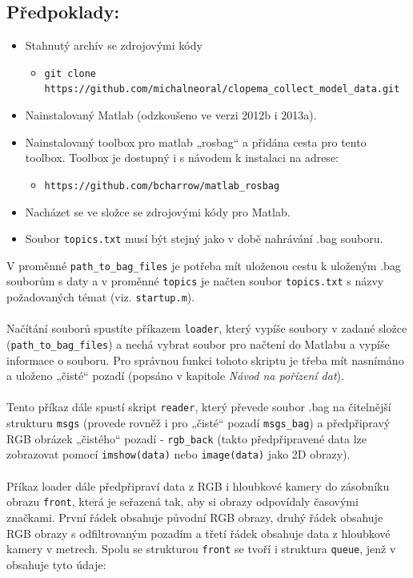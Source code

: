 \documentclass[10pt,a4paper,titlepage,oneside]{book}
\begin{document}
\subsection*{Předpoklady:}
\begin{itemize}
   \item Stahnutý archív se zdrojovými kódy
  \begin{itemize}
  	\item \verb|git clone https://github.com/michalneoral/clopema_collect_model_data.git|
  \end{itemize}
  
  \item Nainstalovaný Matlab (odzkoušeno ve verzi 2012b i 2013a).
  \item Nainstalovaný toolbox pro matlab „rosbag“ a přidána cesta pro tento toolbox. Toolbox je dostupný i s návodem k instalaci na adrese:
  \begin{itemize}
     \item \verb|https://github.com/bcharrow/matlab_rosbag|
  \end{itemize}
  \item Nacházet se ve složce se zdrojovými kódy pro Matlab.
  \item Soubor \verb|topics.txt| musí být stejný jako v době nahrávání .bag souboru.
\end{itemize}

V proměnné \verb|path_to_bag_files| je potřeba mít uloženou cestu k uloženým .bag souborům s daty a v proměnné \verb|topics| je načten soubor \verb|topics.txt| s názvy požadovaných témat (viz. \verb|startup.m|).\\
\\
Načítání souborů spustíte příkazem \verb|loader|, který vypíše soubory v zadané složce (\verb|path_to_bag_files|) a nechá vybrat soubor pro načtení do Matlabu a vypíše informace o souboru. Pro správnou funkci tohoto skriptu je třeba mít nasnímáno a uloženo „čisté“ pozadí (popsáno v kapitole \textit{Návod na pořízení dat}).\\
\\
Tento příkaz dále spustí skript \verb|reader|, který převede soubor .bag na čitelnější strukturu \verb|msgs| (provede rovněž i pro „čisté“ pozadí \verb|msgs_bag|) a předpřipravý RGB obrázek „čistého“ pozadí - \verb|rgb_back| (takto předpřipravené data lze zobrazovat pomocí \verb|imshow(data)| nebo \verb|image(data)| jako 2D obrazy). \\
\\
Příkaz loader dále předpřipraví data z RGB i hloubkové kamery do zásobníku obrazu \verb|front|, která je seřazená tak, aby si obrazy odpovídaly časovými značkami. První řádek obsahuje původní RGB obrazy, druhý řádek obsahuje RGB obrazy s odfiltrovaným pozadím a třetí řádek obsahuje data z hloubkové kamery v metrech.
Spolu se strukturou \verb|front| se tvoří i struktura \verb|queue|, jenž v obsahuje tyto údaje:
\end{document}
